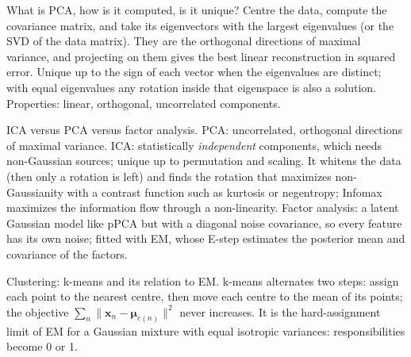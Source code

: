 

\begin{qabox}{\cexam What is PCA, how is it computed, is it unique?}
\ans Centre the data, compute the covariance matrix, and take its eigenvectors with the largest
eigenvalues (or the SVD of the data matrix). They are the orthogonal directions of maximal
variance, and projecting on them gives the best linear reconstruction in squared error. Unique up
to the sign of each vector when the eigenvalues are distinct; with equal eigenvalues any rotation
inside that eigenspace is also a solution. Properties: linear, orthogonal, uncorrelated components.
\end{qabox}

\begin{qabox}{\cexam ICA versus PCA versus factor analysis.}
\ans PCA: uncorrelated, orthogonal directions of maximal variance. ICA: statistically
\emph{independent} components, which needs non-Gaussian sources; unique up to permutation and
scaling. It whitens the data (then only a rotation is left) and finds the rotation that maximizes
non-Gaussianity with a contrast function such as kurtosis or negentropy; Infomax maximizes the
information flow through a non-linearity. Factor analysis: a latent Gaussian model like pPCA but
with a diagonal noise covariance, so every feature has its own noise; fitted with EM, whose E-step
estimates the posterior mean and covariance of the factors.
\end{qabox}

\begin{qabox}[Klambauer]{\pred Clustering: k-means and its relation to EM.}
\ans k-means alternates two steps: assign each point to the nearest centre, then move each centre
to the mean of its points; the objective $\sum_n\lVert\mathbf{x}_n-\bm\mu_{c(n)}\rVert^2$ never
increases. It is the hard-assignment limit of EM for a Gaussian mixture with equal isotropic
variances: responsibilities become 0 or 1.
\end{qabox}

